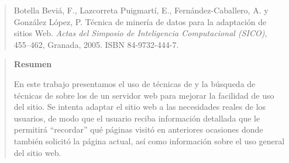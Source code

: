 \begin{quote}
  Botella Beviá, F., Lazcorreta Puigmartí, E., Fernández-Caballero, A. y González López, P. Técnica de minería de datos para la adaptación de sitios Web. \emph{Actas del Simposio de Inteligencia Computacional ({SICO})}, 455--462, Granada, 2005. ISBN 84-9732-444-7.   
\end{quote}

\begin{quote}
	\textbf{Resumen}

	\nopagebreak En este trabajo presentamos el uso de técnicas de \dm y la búsqueda de técnicas de \prediccion sobre los \flogs de un servidor web para mejorar la facilidad de uso del sitio. Se intenta adaptar el sitio web a las necesidades reales de los usuarios, de modo que el usuario reciba información detallada que le permitirá "`recordar"' qué páginas visitó en anteriores ocasiones donde también solicitó la página actual, así como información sobre el uso general del sitio web.
\end{quote}
